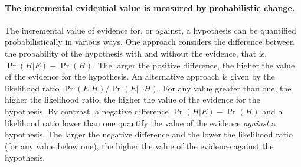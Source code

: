 \documentclass[10pt]{article}
\begin{document}
\paragraph{The incremental evidential value is measured by probabilistic change.}
The incremental value of evidence for, or against, a hypothesis 
can be quantified probabilistically in various ways. 
One approach considers the difference between the probability of 
the hypothesis with and without the evidence, that is, $\Pr(H | E) - \Pr(H)$.
The larger the positive difference, the higher the value of the evidence 
for the hypothesis. 
An alternative approach is given by the likelihood ratio $\Pr(E|H)/\Pr(E| \neg H)$. 
For any value greater than one, the higher the likelihood ratio, 
the higher the value of the evidence for the hypothesis. 
%
%
By contrast, a negative difference $\Pr(H | E) - \Pr(H)$ and a likelihood ratio lower than one 
quantify the value of the evidence \textit{against} a hypothesis.
The larger the negative difference and the lower the likelihood ratio (for any value below one), 
the higher the value of the evidence against the hypothesis.
\end{document}
